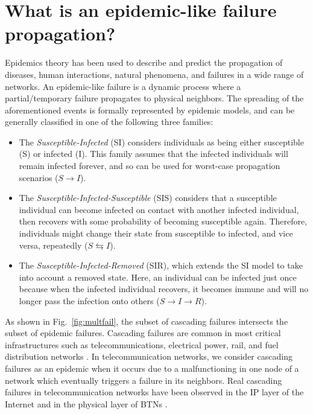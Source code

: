\documentclass[10pt,draftclsnofoot,onecolumn,journal]{IEEEtran}
\begin{document}
\section{What is an epidemic-like failure propagation?\label{soa}}

Epidemics theory has been used to describe and predict the propagation of diseases, human interactions, natural phenomena, and failures in a wide range of networks. An epidemic-like failure is a dynamic process where a partial/temporary failure propagates to physical neighbors. The spreading of the aforementioned events is formally represented by epidemic models, and can be generally classified in one of the following three families:
\begin{itemize}
	\item The \emph{Susceptible-Infected} (SI) considers individuals as being either susceptible (S) or infected (I). This family assumes that the infected individuals will remain infected forever, and so can be used for worst-case propagation scenarios ($S\rightarrow I$).
	\item The \textit{Susceptible-Infected-Susceptible} (SIS) considers that a susceptible individual can become infected on contact with another infected individual, then recovers with some probability of becoming susceptible again. Therefore, individuals might change their state from susceptible to infected, and vice versa, repeatedly ($S\leftrightarrows I$).
	\item The \textit{Susceptible-Infected-Removed} (SIR), which extends the SI model to take into account a removed state. Here, an individual can be infected just once because when the infected individual recovers, it becomes immune and will no longer pass the infection onto others ($S\rightarrow I \rightarrow R$).
\end{itemize}

As shown in Fig.~\ref{fig:multfail}, the subset of cascading failures intersects the subset of epidemic failures. Cascading failures are common in most critical infrastructures such as telecommunications, electrical power, rail, and fuel distribution networks \cite{Strogatz2001}. In telecommunication networks, we consider cascading failures as an epidemic when it occurs due to a malfunctioning in one node of a network which eventually triggers a failure in its neighbors. Real cascading failures in telecommunication networks have been observed in the IP layer of the Internet and in the physical layer of BTNs \cite{wrap32818}. 
\end{document}
